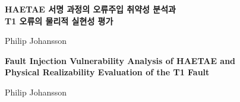 \documentclass[10pt]{article}
\begin{document}
\thispagestyle{empty}
\begin{center}
  \vspace*{1.0em}
  {\LARGE\bfseries
  HAETAE 서명 과정의 오류주입 취약성 분석과\\
  T1 오류의 물리적 실현성 평가\par}
  \vspace{0.8em}
  {\normalsize Philip Johansson\par}
  \vspace{1.0em}
  {\large\bfseries
  Fault Injection Vulnerability Analysis of HAETAE and\\
  Physical Realizability Evaluation of the T1 Fault\par}
  \vspace{0.6em}
  {\normalsize Philip Johansson\par}
\end{center}

\vspace{1.5em}
\begin{minipage}{0.94\textwidth}

\end{minipage}
\vfill

\clearpage
\twocolumn










\end{document}
